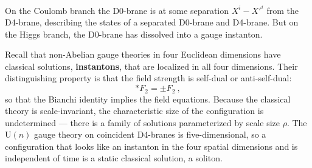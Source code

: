 On the Coulomb branch the D0-brane is at some separation $X^i - X'^i$ from the D4-brane, describing the states of a separated D0-brane and D4-brane. But on the Higgs branch, the D0-brane has dissolved into a gauge instanton.

Recall that non-Abelian gauge theories in four Euclidean dimensions have classical solutions, \textbf{instantons}, that are localized in all four dimensions. Their distinguishing property is that the field strength is self-dual or anti-self-dual:
\begin{equation}
	*F_{\textit{2}} = \pm F_{\textit{2}} \:, \label{13.6.32}
\end{equation}
so that the Bianchi identity implies the field equations. Because the classical theory is scale-invariant, the characteristic size of the configuration is undetermined --- there is a family of solutions parameterized by scale size $\rho$. The $\mathrm{U}(n)$ gauge theory on coincident D4-branes is five-dimensional, so a configuration that looks like an instanton in the four spatial dimensions and is independent of time is a static classical solution, a soliton.

